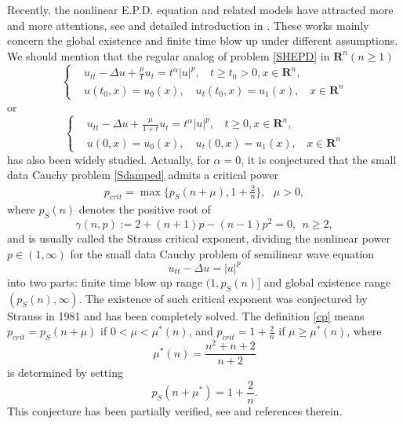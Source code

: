 \documentclass[review]{elsarticle}
\newcommand{\R}{\mathbf{R}}
\begin{document}
Recently, the nonlinear E.P.D. equation and related models have attracted more and more attentions, see \cite{Kel57, Lev74, Lev76, Ues94, Zha18, DLu13, Dab} and detailed introduction in \cite{FLT}. These works mainly concern the global existence and finite time blow up under different assumptions. We should mention that the regular analog of problem \eqref{SHEPD} in $\R^n(n\ge 1)$
\begin{equation}
\label{REPD}
\left\{
\begin{aligned}
& u_{tt}-\Delta u+\frac{\mu}{t}u_t=t^\alpha|u|^p, ~~~~t\ge t_0>0, x\in \R^n,\\
& u(t_0, x)=u_0(x), \quad u_t(t_0, x)=u_1(x),~~~~x\in \R^n
\end{aligned}
\right.
\end{equation}
or
\begin{equation}
\label{Sdamped}
\left\{
\begin{aligned}
& u_{tt}-\Delta u+\frac{\mu}{1+t}u_t=t^\alpha|u|^p, ~~~~t\ge 0, x\in \R^n,\\
& u(0, x)=u_0(x), \quad u_t(0, x)=u_1(x),~~~~x\in \R^n
\end{aligned}
\right.
\end{equation}
has also been widely studied. Actually, for $\alpha=0$, it is conjectured that the small data Cauchy problem \eqref{Sdamped} admits a critical power
\begin{equation}\label{cp}
\begin{aligned}
p_{crit}=\max\Big\{p_S(n+\mu), 1+\frac 2n\Big\},~~~\mu>0,
\end{aligned}
\end{equation}
where $p_S(n)$ denotes the positive root of
\[
\gamma(n, p):=2+(n+1)p-(n-1)p^2=0,~~n\ge 2,
\]
 and is usually called the Strauss critical exponent, dividing the nonlinear power $p\in (1, \infty)$ for the small data Cauchy problem of semilinear wave equation
\[
u_{tt}-\Delta u=|u|^p
\]
into two parts: finite time blow up range $(1, p_S(n)]$ and global existence range $(p_S(n), \infty)$. The existence of such critical exponent was conjectured by Strauss \cite{Str81} in 1981 and has been completely solved.
The definition \eqref{cp} means $p_{crit}=p_S(n+\mu)$ if $0<\mu<\mu^*(n)$, and $p_{crit}=1+\frac 2n$ if $\mu\ge \mu^*(n)$, where
\begin{equation}\label{mun}
\mu^*(n)=\frac{n^2+n+2}{n+2}
\end{equation}
 is determined by setting
\[
p_S(n+\mu^*)=1+\frac 2n.
\]
This conjecture has been partially verified, see \cite{Dab15, Dab, DaL15, DLR15, HeL25, HLY24, HLY25, HSZ25, Ike, IKTW20, Wak16, KaS19, Lai20, LST20, LTW17, LZ21, LiY25, LiY26, Pal19, TuL19} and references therein.
\end{document}
